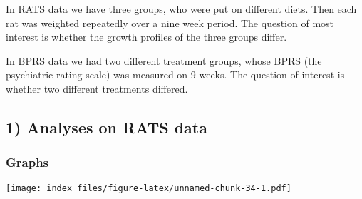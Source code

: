 \documentclass[]{article}
\newenvironment{Shaded}{\begin{snugshade}}{\end{snugshade}}
\newcommand{\KeywordTok}[1]{\textcolor[rgb]{0.13,0.29,0.53}{\textbf{#1}}}
\newcommand{\DataTypeTok}[1]{\textcolor[rgb]{0.13,0.29,0.53}{#1}}
\newcommand{\DecValTok}[1]{\textcolor[rgb]{0.00,0.00,0.81}{#1}}
\newcommand{\StringTok}[1]{\textcolor[rgb]{0.31,0.60,0.02}{#1}}
\newcommand{\CommentTok}[1]{\textcolor[rgb]{0.56,0.35,0.01}{\textit{#1}}}
\newcommand{\OperatorTok}[1]{\textcolor[rgb]{0.81,0.36,0.00}{\textbf{#1}}}
\newcommand{\NormalTok}[1]{#1}
\begin{document}
In RATS data we have three groups, who were put on different diets. Then
each rat was weighted repeatedly over a nine week period. The question
of most interest is whether the growth profiles of the three groups
differ.

In BPRS data we had two different treatment groups, whose BPRS (the
psychiatric rating scale) was measured on 9 weeks. The question of
interest is whether two different treatments differed.

\subsection{1) Analyses on RATS data}\label{analyses-on-rats-data}

\subsubsection{Graphs}\label{graphs}

\begin{Shaded}
\end{Shaded}

\texttt{[image: index\_files/figure-latex/unnamed-chunk-34-1.pdf]}
\end{document}
